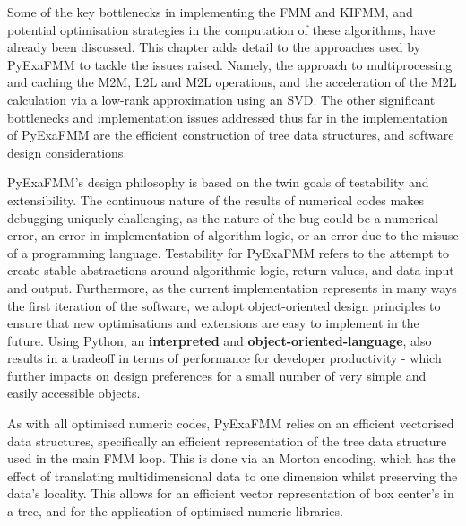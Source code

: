 Some of the key bottlenecks in implementing the \gls{FMM} and \gls{KIFMM}, and potential
optimisation strategies in the computation of these algorithms, have already been
discussed. This chapter adds detail to the approaches used by \gls{PyExaFMM} to tackle
the issues raised. Namely, the approach to multiprocessing and caching the \gls{M2M},
\gls{L2L} and \gls{M2L} operations, and the acceleration of the \gls{M2L} calculation
via a low-rank approximation using an \gls{SVD}. The other significant bottlenecks
and implementation issues addressed thus far in the implementation of \gls{PyExaFMM} are the
efficient construction of tree data structures, and software design considerations.

\gls{PyExaFMM}'s design philosophy is based on the twin goals of testability
and extensibility. The continuous nature of the results of numerical codes makes
debugging uniquely challenging, as the nature of the bug could be a numerical error,
an error in implementation of algorithm logic, or an error due to the misuse of a
programming language. Testability for \gls{PyExaFMM} refers to
the attempt to create stable abstractions around algorithmic logic, return values,
and data input and output. Furthermore, as the current implementation represents
in many ways the first iteration of the software, we adopt object-oriented
design principles to ensure that new optimisations and extensions are easy
to implement in the future. Using Python, an \textbf{\gls{interpreted}} and
\textbf{\gls{object-oriented-language}}, also results in a tradeoff in terms of
performance for developer productivity - which further impacts on design preferences
for a small number of very simple and easily accessible objects.

As with all optimised numeric codes, \gls{PyExaFMM} relies on an efficient
vectorised data structures, specifically an efficient representation of the tree
data structure used in the main \gls{FMM} loop. This is done via an Morton encoding,
which has the effect of translating multidimensional data to one dimension whilst
preserving the data's locality. This allows for an efficient vector representation
of box center's in a tree, and for the application of optimised numeric libraries.
